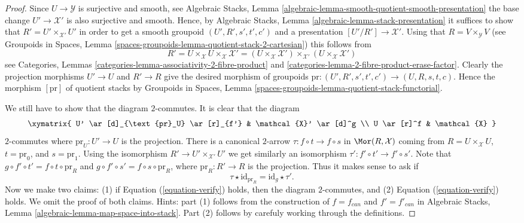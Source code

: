\begin{proof}
Since $U \to \mathcal{Y}$ is surjective and smooth, see
Algebraic Stacks,
Lemma \ref{algebraic-lemma-smooth-quotient-smooth-presentation}
the base change $U' \to \mathcal{X}'$ is also surjective and smooth.
Hence, by
Algebraic Stacks,
Lemma \ref{algebraic-lemma-stack-presentation}
it suffices to show that $R' = U' \times_{\mathcal{X}'} U'$ in order to
get a smooth groupoid $(U', R', s', t', c')$ and a presentation
$[U'/R'] \to \mathcal{X}'$.
Using that $R = V \times_\mathcal{Y} V$ (see
Groupoids in Spaces,
Lemma \ref{spaces-groupoids-lemma-quotient-stack-2-cartesian})
this follows from
$$
R' =
U \times_\mathcal{X} U \times_\mathcal{X} \mathcal{X}' =
(U \times_\mathcal{X} \mathcal{X}')
\times_{\mathcal{X}'}
(U \times_\mathcal{X} \mathcal{X}')
$$
see
Categories, Lemmas \ref{categories-lemma-associativity-2-fibre-product} and
\ref{categories-lemma-2-fibre-product-erase-factor}.
Clearly the projection morphisms $U' \to U$ and $R' \to R$ give the
desired morphism of groupoids
$\text{pr} : (U', R', s', t', c') \to (U, R, s, t, c)$.
Hence the morphism $[\text{pr}]$ of quotient stacks by
Groupoids in Spaces,
Lemma \ref{spaces-groupoids-lemma-quotient-stack-functorial}.

\medskip\noindent
We still have to show that the diagram $2$-commutes.
It is clear that the diagram
$$
\xymatrix{
U' \ar[d]_{\text{pr}_U} \ar[r]_{f'} & \mathcal{X}' \ar[d]^g \\
U \ar[r]^f & \mathcal{X}
}
$$
$2$-commutes where $\text{pr}_U : U' \to U$ is the projection.
There is a canonical $2$-arrow
$\tau : f \circ t \to f \circ s$ in $\Mor(R, \mathcal{X})$
coming from $R = U \times_\mathcal{X} U$, $t = \text{pr}_0$, and
$s = \text{pr}_1$. Using the isomorphism
$R' \to U' \times_{\mathcal{X}'} U'$ we get similarly an isomorphism
$\tau' : f' \circ t' \to f' \circ s'$. Note that
$g \circ f' \circ t' = f \circ t \circ \text{pr}_R$ and
$g \circ f' \circ s' = f \circ s \circ \text{pr}_R$, where
$\text{pr}_R : R' \to R$ is the projection. Thus it makes sense to ask
if
\begin{equation}
\label{equation-verify}
\tau \star \text{id}_{\text{pr}_R} = \text{id}_g \star \tau'.
\end{equation}
Now we make two claims: (1) if Equation (\ref{equation-verify}) holds,
then the diagram $2$-commutes, and (2) Equation (\ref{equation-verify}) holds.
We omit the proof of both claims. Hints: part (1) follows from the
construction of $f = f_{can}$ and $f' = f'_{can}$ in
Algebraic Stacks, Lemma \ref{algebraic-lemma-map-space-into-stack}.
Part (2) follows by carefuly working through the definitions.
\end{proof}

